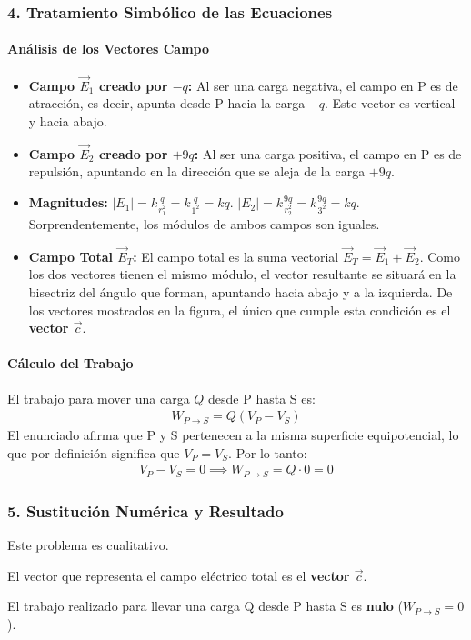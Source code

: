 \subsubsection*{4. Tratamiento Simbólico de las Ecuaciones}
\paragraph*{Análisis de los Vectores Campo}
\begin{itemize}
    \item \textbf{Campo $\vec{E}_1$ creado por $-q$:} Al ser una carga negativa, el campo en P es de atracción, es decir, apunta desde P hacia la carga $-q$. Este vector es vertical y hacia abajo.
    \item \textbf{Campo $\vec{E}_2$ creado por $+9q$:} Al ser una carga positiva, el campo en P es de repulsión, apuntando en la dirección que se aleja de la carga $+9q$.
    \item \textbf{Magnitudes:} $|E_1| = k \frac{q}{r_1^2} = k \frac{q}{1^2} = kq$. $|E_2| = k \frac{9q}{r_2^2} = k \frac{9q}{3^2} = kq$. Sorprendentemente, los módulos de ambos campos son iguales.
    \item \textbf{Campo Total $\vec{E}_T$:} El campo total es la suma vectorial $\vec{E}_T = \vec{E}_1 + \vec{E}_2$. Como los dos vectores tienen el mismo módulo, el vector resultante se situará en la bisectriz del ángulo que forman, apuntando hacia abajo y a la izquierda. De los vectores mostrados en la figura, el único que cumple esta condición es el \textbf{vector $\vec{c}$}.
\end{itemize}

\paragraph*{Cálculo del Trabajo}
El trabajo para mover una carga $Q$ desde P hasta S es:
\begin{gather}
    W_{P \to S} = Q (V_P - V_S)
\end{gather}
El enunciado afirma que P y S pertenecen a la misma superficie equipotencial, lo que por definición significa que $V_P = V_S$. Por lo tanto:
\begin{gather}
    V_P - V_S = 0 \implies W_{P \to S} = Q \cdot 0 = 0
\end{gather}

\subsubsection*{5. Sustitución Numérica y Resultado}
Este problema es cualitativo.
\begin{cajaresultado}
    El vector que representa el campo eléctrico total es el \textbf{vector $\vec{c}$}.
\end{cajaresultado}
\begin{cajaresultado}
    El trabajo realizado para llevar una carga Q desde P hasta S es \textbf{nulo} ($W_{P \to S} = 0$).
\end{cajaresultado}

